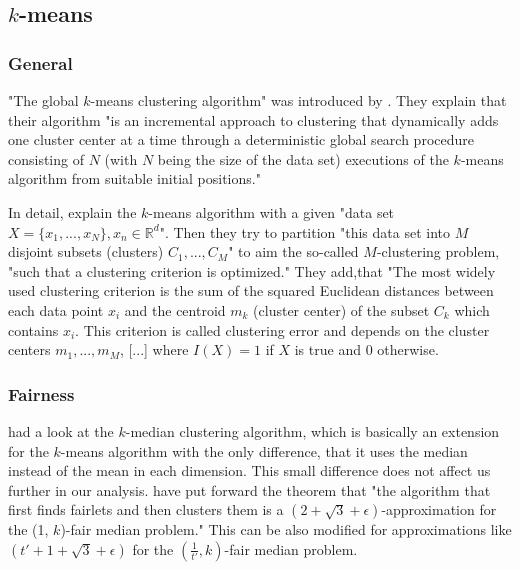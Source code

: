 \subsection{$k$-means}
\label{k-means}

\subsubsection{General}

"The global $k$-means clustering algorithm" was introduced by \textcite[]{Likas2003}. They explain that their algorithm "is an incremental approach to clustering that dynamically adds one cluster center at a time through a deterministic global search procedure consisting of $N$ (with $N$ being the size of the data set) executions of the $k$-means algorithm from suitable initial positions." \autocite[1]{Likas2003}

In detail, \textcite[2]{Likas2003} explain the $k$-means algorithm with a given "data set $X = \{x_{1},...,x_{N}\},x_{n} \in \mathbb{R}^d$". Then they try to partition "this data set into $M$ disjoint subsets (clusters) $C_{1},...,C_{M}$" to aim the so-called $M$-clustering problem, "such that a clustering criterion is optimized." They add,that "The most widely used clustering criterion is the sum of the squared Euclidean distances between each data point $x_{i}$ and the centroid $m_{k}$ (cluster center) of the subset $C_{k}$ which contains $x_{i}$. This criterion is called clustering error and depends on the cluster centers $m_{1},...,m_{M}$, [...] where $I(X) = 1$ if $X$ is true and $0$ otherwise.

\subsubsection{Fairness}

\textcite[]{Chierichetti2018} had a look at the $k$-median clustering algorithm, which is basically an extension for the $k$-means algorithm with the only difference, that it uses the median instead of the mean in each dimension. \autocite[]{Jain1988} This small difference does not affect us further in our analysis. \textcite[]{Chierichetti2018} have put forward the theorem that "the algorithm that first finds fairlets and then clusters them is a $(2 + \sqrt{3} + \epsilon)$-approximation for the (1, $k$)-fair median problem." This can be also modified for approximations like $(t' + 1 + \sqrt{3} + \epsilon)$ for the $(\frac{1}{t'}, k)$-fair median problem. \autocite[9]{Chierichetti2018}

